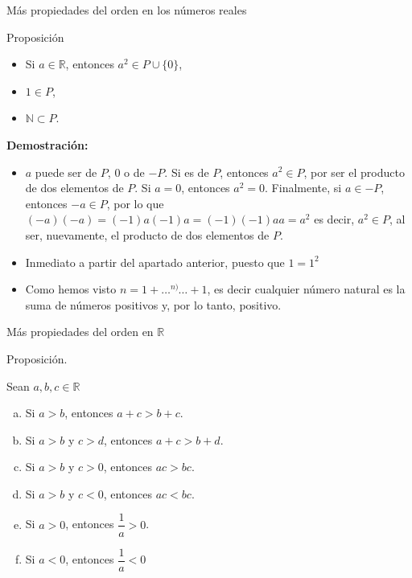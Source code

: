\documentclass[
  ignorenonframetext,
]{beamer}
\providecommand{\tightlist}{%
  \setlength{\itemsep}{0pt}\setlength{\parskip}{0pt}}
\begin{document}
\begin{frame}{Más propiedades del orden en los números reales}
\protect\hypertarget{muxe1s-propiedades-del-orden-en-los-nuxfameros-reales}{}

Proposición

\begin{itemize}
\tightlist
\item
  Si \(a \in \mathbb{R}\), entonces \(a^2 \in P \cup \{0\}\),
\item
  \(1 \in P\),
\item
  \(\mathbb{N} \subset P\).
\end{itemize}

\textbf{Demostración:}

\begin{itemize}
\item
  \(a\) puede ser de \(P\), \(0\) o de \(-P\). Si es de \(P\), entonces
  \(a^2 \in P\), por ser el producto de dos elementos de \(P\). Si
  \(a=0\), entonces \(a^2 = 0\). Finalmente, si \(a \in -P\), entonces
  \(-a \in P\), por lo que \((-a)(-a) = (-1)a(-1)a=(-1)(-1)aa = a^2\) es
  decir, \(a^2 \in P\), al ser, nuevamente, el producto de dos elementos
  de \(P\).
\item
  Inmediato a partir del apartado anterior, puesto que \(1=1^2\)
\item
  Como hemos visto \(n = 1+ \ldots \overset{n)}{} \ldots + 1\), es decir
  cualquier número natural es la suma de números positivos y, por lo
  tanto, positivo.
\end{itemize}

\end{frame}

\begin{frame}{Más propiedades del orden en \(\mathbb{R}\)}
\protect\hypertarget{muxe1s-propiedades-del-orden-en-mathbbr}{}

Proposición.

Sean \(a,b, c \in \mathbb{R}\)

\begin{enumerate}
[a)]
\tightlist
\item
  Si \(a>b\), entonces \(a+c > b+c\).
\item
  Si \(a>b\) y \(c>d\), entonces \(a+c >b+d\).
\item
  Si \(a>b\) y \(c>0\), entonces \(ac>bc\).
\item
  Si \(a>b\) y \(c<0\), entonces \(ac<bc\).
\item
  Si \(a>0\), entonces \(\dfrac{1}{a} >0\).
\item
  Si \(a<0\), entonces \(\dfrac{1}{a} <0\)
\end{enumerate}

\end{frame}
\end{document}
